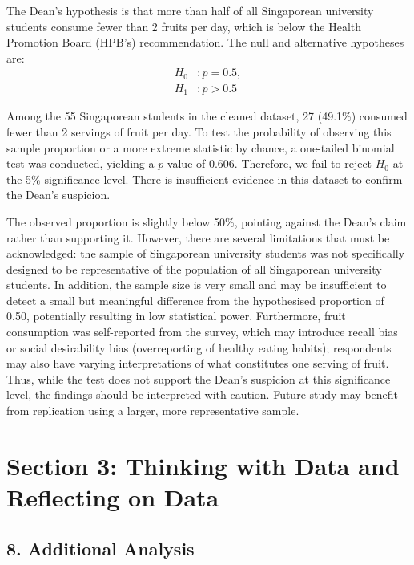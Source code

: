 The Dean's hypothesis is that more than half of all Singaporean university students consume fewer than 2 fruits per day, which is below the Health Promotion Board (HPB's) recommendation. The null and alternative hypotheses are:
\begin{align*}
H_0&: p = 0.5, \\
H_1&: p > 0.5
\end{align*}

Among the 55 Singaporean students in the cleaned dataset, 27 (49.1\%) consumed fewer than 2 servings of fruit per day. To test the probability of observing this sample proportion or a more extreme statistic by chance, a one-tailed binomial test was conducted, yielding a $p$-value of 0.606. Therefore, we fail to reject $H_0$ at the 5\% significance level. There is insufficient evidence in this dataset to confirm the Dean's suspicion.

The observed proportion is slightly below 50\%, pointing against the Dean's claim rather than supporting it. However, there are several limitations that must be acknowledged: the sample of Singaporean university students was not specifically designed to be representative of the population of all Singaporean university students. In addition, the sample size is very small and may be insufficient to detect a small but meaningful difference from the hypothesised proportion of 0.50, potentially resulting in low statistical power. Furthermore, fruit consumption was self-reported from the survey, which may introduce recall bias or social desirability bias (overreporting of healthy eating habits); respondents may also have varying interpretations of what constitutes one serving of fruit. Thus, while the test does not support the Dean's suspicion at this significance level, the findings should be interpreted with caution. Future study may benefit from replication using a larger, more representative sample.

\section*{Section 3: Thinking with Data and Reflecting on Data}

\subsection*{8. Additional Analysis}

